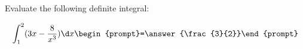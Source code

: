 \documentclass{ximera}
\author{Jim Talamo}
\begin{document}
\begin{exercise}
Evaluate the following definite integral:

\[
\int_1^2 (3x-\frac{8}{x^3}) \d x 
\begin{prompt}=\answer{\frac{3}{2}}\end{prompt}
\]
\end{exercise}
\end{document}
